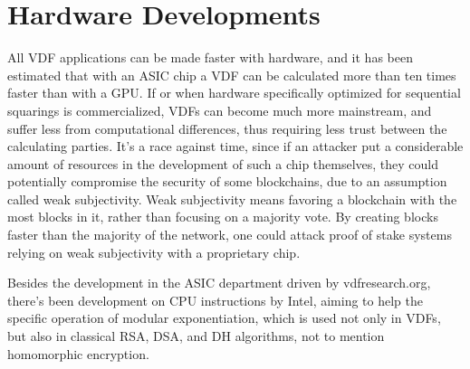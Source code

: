 \section{Hardware Developments}
All VDF applications can be made faster with hardware, and it has been estimated that with an ASIC chip a VDF can be calculated more than ten times faster than with a GPU.\cite{Stanford_Video2020-ap} If or when hardware specifically optimized for sequential squarings is commercialized, VDFs can become much more mainstream, and suffer less from computational differences, thus requiring less trust between the calculating parties. It's a race against time, since if an attacker put a considerable amount of resources in the development of such a chip themselves, they could potentially compromise the security of some blockchains, due to an assumption called weak subjectivity.\cite{noauthor_2018-ro} Weak subjectivity means favoring a blockchain with the most blocks in it, rather than focusing on a majority vote.\cite{Buterin2019-jz} By creating blocks faster than the majority of the network, one could attack proof of stake systems relying on weak subjectivity with a proprietary chip.

Besides the development in the ASIC department driven by vdfresearch.org\cite{noauthor_undated-hk}, there's been development on CPU instructions by Intel, aiming to help the specific operation of modular exponentiation, which is used not only in VDFs, but also in classical RSA, DSA, and DH algorithms, not to mention homomorphic encryption.\cite{Drucker2019-cx} 
